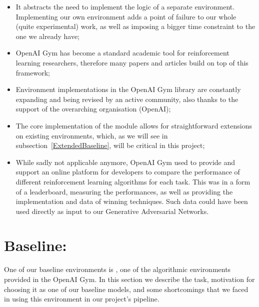 \begin{itemize}
	\item It abstracts the need to implement the logic of a separate environment. Implementing our own environment adds a point of failure to our whole (quite experimental) work, as well as imposing a bigger time constraint to the one we already have;
	\item OpenAI Gym has become a standard academic tool for reinforcement learning researchers, therefore many papers and articles build on top of this framework;
	\item Environment implementations in the OpenAI Gym library are constantly expanding and being revised by an active community, also thanks to the support of the overarching organisation (OpenAI);
	\item The core implementation of the  module \parencite{gymgymat12:online} allows for straightforward extensions on existing environments, which, as we will see in subsection~\ref{ExtendedBaseline}, will be critical in this project;
	\item While sadly not applicable anymore, OpenAI Gym used to provide and support an online platform for developers to compare the performance of different reinforcement learning algorithms for each task. This was in a form of a leaderboard, measuring the performances, as well as providing the implementation and data of winning techniques. Such data could have been used directly as input to our Generative Adversarial Networks.
\end{itemize}



\section{Baseline: }
One of our baseline environments is  \parencite{OpenAIGy42:online}, one of the algorithmic environments provided in the OpenAI Gym. In this section we describe the task, motivation for choosing it as one of our baseline models, and some shortcomings that we faced in using this environment in our project's pipeline.
